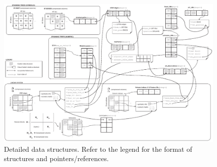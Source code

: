 \documentclass[a4paper,11pt]{article}
\begin{document}
\begin{figure}
\centering
\includegraphics[width=1.0\textwidth]{imgs/srba_data_structures.pdf} 
\caption{Detailed data structures. Refer to the legend for the format of structures and pointers/references.}
\label{fig:detailed.data.structures}
\end{figure}





\newpage


\end{document}
